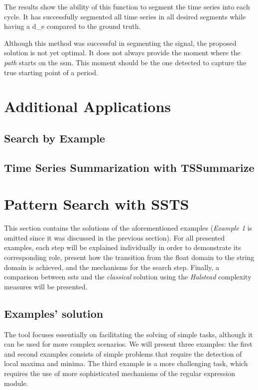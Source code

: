 The results show the ability of this function to segment the time series into each cycle. It has successfully segmented all time series in all desired segments while having a \gls{d_e} compared to the ground truth.
\par
Although this method was successful in segmenting the signal, the proposed solution is not yet optimal. It does not always provide the moment where the \textit{path} starts on the \gls{ssm}. This moment should be the one detected to capture the true starting point of a period. 


\section{Additional Applications}

\subsection{Search by Example}

\subsection{Time Series Summarization with TSSummarize}


\section{Pattern Search with SSTS}

This section contains the solutions of the aforementioned examples (\textit{Example 1} is omitted since it was discussed in the previous section). For all presented examples, each step will be explained individually in order to demonstrate its corresponding role, present how the transition from the float domain to the string domain is achieved, and the mechanisms for the search step. Finally, a comparison between \gls{ssts} and the \textit{classical} solution using the \textit{Halstead} complexity measures will be presented.

\subsection{Examples' solution}
The tool focuses essentially on facilitating the solving of simple tasks, although it can be used for more complex scenarios. We will present three examples: the first and second examples consists of simple problems that require the detection of local maxima and minima. The third example is a more challenging task, which requires the use of more sophisticated mechanisms of the regular expression module.

